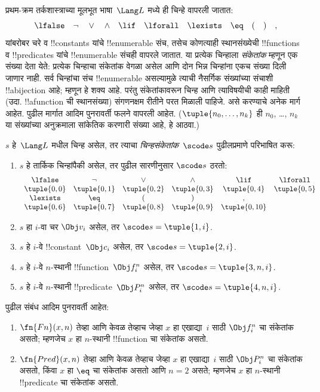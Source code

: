 \documentclass[../../../include/open-logic-section]{subfiles}
\begin{document}

प्रथम-क्रम तर्कशास्त्राच्या मूलभूत भाषा~$\Lang L$ मध्ये ही चिन्हे वापरली जातात:
\[
\lfalse \quad \lnot \quad \lor \quad \land \quad \lif \quad \lforall
\quad \lexists \quad \eq \quad ( \quad ) \quad ,
\]
यांबरोबर चरे व !!{constant}s यांचे !!{enumerable} संच, तसेच कोणत्याही
स्थानसंख्येची !!{function}s व !!{predicate}s यांचे !!{enumerable} संचही
वापरले जातात. या प्रत्येक चिन्हाला \emph{संकेतांक} म्हणून एक संख्या
देता येते: प्रत्येक चिन्हाचा संकेतांक वेगळा असेल आणि दोन भिन्न
चिन्हांना एकच संख्या दिली जाणार नाही. सर्व चिन्हांचा संच !!{enumerable}
असल्यामुळे त्याची नैसर्गिक संख्यांच्या संचाशी !!a{bijection} आहे;
म्हणून हे शक्य आहे. परंतु संकेतांकावरून चिन्ह आणि त्याविषयीची काही
माहिती (उदा. !!a{function} ची स्थानसंख्या) संगणनक्षम रीतीने परत
मिळाली पाहिजे. असे करण्याचे अनेक मार्ग आहेत. पुढील मार्गात आदिम
पुनरावर्ती फलने वापरली आहेत. ($\tuple{n_0, \dots, n_k}$ ही
$n_0$, \dots, $n_k$ या संख्यांच्या अनुक्रमाला सांकेतिक करणारी संख्या
आहे, हे आठवा.)

\begin{defn}
$s$ हे~$\Lang L$ मधील चिन्ह असेल, तर त्याचा \emph{चिन्हसंकेतांक}~$\scode s$
पुढीलप्रमाणे परिभाषित करू:
\begin{enumerate}
\item $s$ हे तार्किक चिन्हांपैकी असेल, तर पुढील सारणीनुसार $\scode s$ ठरतो:
\[
\begin{array}{cccccccccc}
  \lfalse & \lnot & \lor & \land & \lif & \lforall \\
\tuple{0, 0} & \tuple{0, 1} & \tuple{0, 2} & \tuple{0, 3} &
\tuple{0, 4} & \tuple{0, 5} \\
\lexists & \eq & ( & ) & ,\\
\tuple{0, 6} & \tuple{0, 7} &
\tuple{0, 8} & \tuple{0, 9} & \tuple{0, 10}
\end{array}
\]
\item $s$ हा $i$-वा चर $\Obj v_i$ असेल, तर $\scode s = \tuple{1, i}$.
\item $s$ हे $i$-वे !!{constant}~$\Obj c_i$ असेल, तर
  $\scode s = \tuple{2, i}$.
\item $s$ हे $i$-वे $n$-स्थानी !!{function}~$\Obj f_i^n$ असेल, तर
  $\scode s = \tuple{3, n, i}$.
\item $s$ हे $i$-वे $n$-स्थानी !!{predicate}~$\Obj P_i^n$ असेल, तर
  $\scode s = \tuple{4, n, i}$.
\end{enumerate}
\end{defn}

\begin{prop}
पुढील संबंध आदिम पुनरावर्ती आहेत:
\begin{enumerate}
\item $\fn{Fn}(x, n)$ तेव्हा आणि केवळ तेव्हाच जेव्हा $x$ हा एखाद्या~$i$ साठी
  $\Obj f^n_i$ चा संकेतांक असतो; म्हणजेच $x$ हा $n$-स्थानी
  !!{function} चा संकेतांक असतो.
\item $\fn{Pred}(x, n)$ तेव्हा आणि केवळ तेव्हाच जेव्हा $x$ हा एखाद्या~$i$ साठी
  $\Obj P^n_i$ चा संकेतांक असतो, किंवा $x$ हा $\eq$ चा संकेतांक
  असतो आणि $n = 2$ असते; म्हणजेच $x$ हा $n$-स्थानी !!{predicate}
  चा संकेतांक असतो.
\end{enumerate}
\end{prop}
\end{document}
